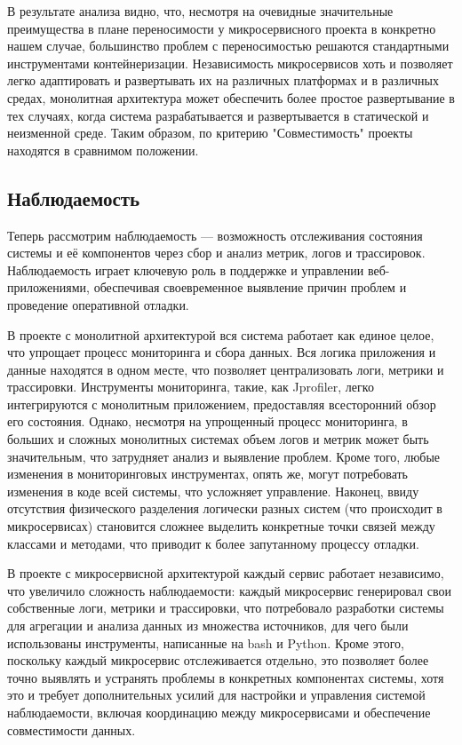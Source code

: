     В результате анализа видно, что, несмотря на очевидные значительные преимущества в плане переносимости у микросервисного проекта в конкретно нашем случае, большинство проблем с переносимостью решаются стандартными инструментами контейнеризации. Независимость микросервисов хоть и позволяет легко адаптировать и развертывать их на различных платформах и в различных средах, монолитная архитектура может обеспечить более простое развертывание в тех случаях, когда система разрабатывается и развертывается в статической и неизменной среде.  Таким образом, по критерию "Совместимость" проекты находятся в сравнимом положении.

\subsection{Наблюдаемость}
    Теперь рассмотрим наблюдаемость — возможность отслеживания состояния системы и её компонентов через сбор и анализ метрик, логов и трассировок. Наблюдаемость играет ключевую роль в поддержке и управлении веб-приложениями, обеспечивая своевременное выявление причин проблем и проведение оперативной отладки.
    
    В проекте с монолитной архитектурой вся система работает как единое целое, что упрощает процесс мониторинга и сбора данных. Вся логика приложения и данные находятся в одном месте, что позволяет централизовать логи, метрики и трассировки. Инструменты мониторинга, такие, как Jprofiler, легко интегрируются с монолитным приложением, предоставляя всесторонний обзор его состояния. Однако, несмотря на упрощенный процесс мониторинга, в больших и сложных монолитных системах объем логов и метрик может быть значительным, что затрудняет анализ и выявление проблем. Кроме того, любые изменения в мониторинговых инструментах, опять же, могут потребовать изменения в коде всей системы, что усложняет управление. Наконец, ввиду отсутствия физического разделения логически разных систем (что происходит в микросервисах) становится сложнее выделить конкретные точки связей между классами и методами, что приводит к более запутанному процессу отладки.
    
    В проекте с микросервисной архитектурой каждый сервис работает независимо, что увеличило сложность наблюдаемости: каждый микросервис генерировал свои собственные логи, метрики и трассировки, что потребовало разработки системы для агрегации и анализа данных из множества источников, для чего были использованы инструменты, написанные на bash и Python. Кроме этого, поскольку каждый микросервис отслеживается отдельно, это позволяет более точно выявлять и устранять проблемы в конкретных компонентах системы, хотя это и требует дополнительных усилий для настройки и управления системой наблюдаемости, включая координацию между микросервисами и обеспечение совместимости данных.
    
